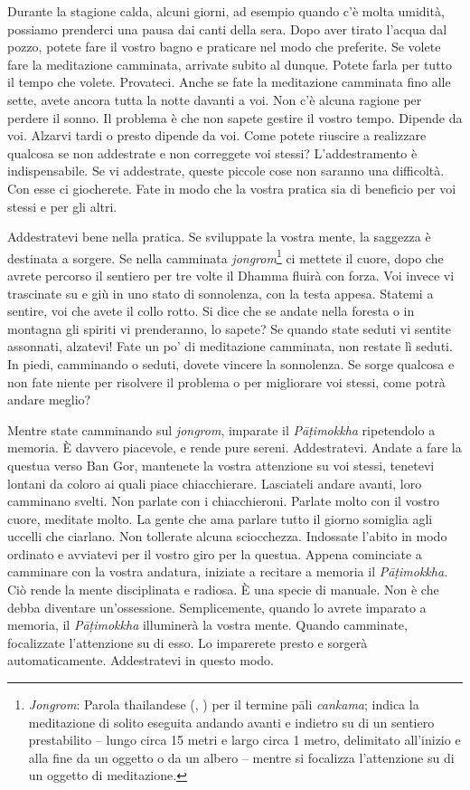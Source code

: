 Durante la stagione calda, alcuni giorni, ad esempio quando c'è molta
umidità, possiamo prenderci una pausa dai canti della sera. Dopo aver
tirato l'acqua dal pozzo, potete fare il vostro bagno e praticare nel
modo che preferite. Se volete fare la meditazione camminata, arrivate
subito al dunque. Potete farla per tutto il tempo che volete. Provateci.
Anche se fate la meditazione camminata fino alle sette, avete ancora
tutta la notte davanti a voi. Non c'è alcuna ragione per perdere il
sonno. Il problema è che non sapete gestire il vostro tempo. Dipende da
voi. Alzarvi tardi o presto dipende da voi. Come potete riuscire a
realizzare qualcosa se non addestrate e non correggete voi stessi?
L'addestramento è indispensabile. Se vi addestrate, queste piccole cose
non saranno una difficoltà. Con esse ci giocherete. Fate in modo che la
vostra pratica sia di beneficio per voi stessi e per gli altri.

Addestratevi bene nella pratica. Se sviluppate la vostra mente, la
saggezza è destinata a sorgere. Se nella camminata
\emph{jongrom}\footnote{\emph{Jongrom}: Parola thailandese (,
  ) per il termine pāli \emph{cankama}; indica la meditazione
  di solito eseguita andando avanti e indietro su di un sentiero
  prestabilito -- lungo circa 15 metri e largo circa 1 metro, delimitato
  all'inizio e alla fine da un oggetto o da un albero -- mentre si
  focalizza l'attenzione su di un oggetto di meditazione.} ci mettete il
cuore, dopo che avrete percorso il sentiero per tre volte il Dhamma
fluirà con forza. Voi invece vi trascinate su e giù in uno stato di
sonnolenza, con la testa appesa. Statemi a sentire, voi che avete il
collo rotto. Si dice che se andate nella foresta o in montagna gli
spiriti vi prenderanno, lo sapete? Se quando state seduti vi sentite
assonnati, alzatevi! Fate un po' di meditazione camminata, non restate
lì seduti. In piedi, camminando o seduti, dovete vincere la sonnolenza.
Se sorge qualcosa e non fate niente per risolvere il problema o per
migliorare voi stessi, come potrà andare meglio?

Mentre state camminando sul \emph{jongrom}, imparate il
\emph{Pāṭimokkha} ripetendolo a memoria. È davvero piacevole, e rende
pure sereni. Addestratevi. Andate a fare la questua verso Ban Gor,
mantenete la vostra attenzione su voi stessi, tenetevi lontani da coloro
ai quali piace chiacchierare. Lasciateli andare avanti, loro camminano
svelti. Non parlate con i chiacchieroni. Parlate molto con il vostro
cuore, meditate molto. La gente che ama parlare tutto il giorno somiglia
agli uccelli che ciarlano. Non tollerate alcuna sciocchezza. Indossate
l'abito in modo ordinato e avviatevi per il vostro giro per la questua.
Appena cominciate a camminare con la vostra andatura, iniziate a
recitare a memoria il \emph{Pāṭimokkha}. Ciò rende la mente disciplinata
e radiosa. È una specie di manuale. Non è che debba diventare
un'ossessione. Semplicemente, quando lo avrete imparato a memoria, il
\emph{Pāṭimokkha} illuminerà la vostra mente. Quando camminate,
focalizzate l'attenzione su di esso. Lo imparerete presto e sorgerà
automaticamente. Addestratevi in questo modo.

